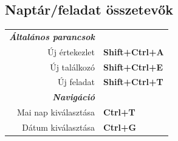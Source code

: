 \documentclass[12pt]{article}
\begin{document}
\begin{landscape}
\begin{center}
\begin{multicols}{2}
	\section*{Naptár/feladat összetevők}
	\begin{tabular*}{4in}{rp{1.5in}}
		\textit{\textbf{Általános parancsok}}	&					\\
		Új értekezlet				& \textbf{Shift+Ctrl+A}			\\
		Új találkozó				& \textbf{Shift+Ctrl+E}			\\
		\vspace{1.5mm}
		Új feladat				& \textbf{Shift+Ctrl+T}			\\
		\textit{\textbf{Navigáció}}		&					\\
		Mai nap kiválasztása			& \textbf{Ctrl+T}			\\
		Dátum kiválasztása			& \textbf{Ctrl+G}			\\
	\end{tabular*}
	\end{multicols}
	\end{center}
	\end{landscape}
 
\end{document}
